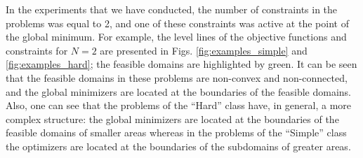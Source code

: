 \documentclass[twocolumn]{svjour3}          %
\begin{document}
	In the experiments that we have conducted, the number of constraints in the problems was equal to 2, and one of these constraints was active at the point of the global minimum. For example, the level lines of the objective functions and constraints for $N=2$ are presented in Figs. \ref{fig:examples_simple} and \ref{fig:examples_hard}; the feasible domains are highlighted by green. It can be seen that the feasible domains in these problems are non-convex and non-connected, and the global minimizers are located at the boundaries of the feasible domains. Also, one can see that the problems of the ``Hard'' class have, in general, a more complex structure: the global minimizers are located at the boundaries of the feasible domains of smaller areas whereas in the problems of the ``Simple'' class the optimizers are located at the boundaries of the subdomains of greater areas.
	
\end{document}
